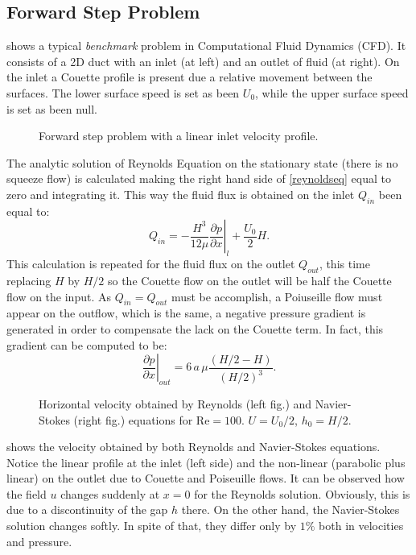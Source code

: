 \subsection{Forward Step Problem}

 shows a typical \emph{benchmark} problem in Computational Fluid Dynamics (CFD). It consists of a 2D duct with an inlet (at left) and an outlet of fluid (at right). On the inlet a Couette profile is present due a relative movement between the surfaces. The lower surface speed is set as been $U_0$, while the upper surface speed is set as been null.

 \begin{figure}[h]
 \centering 
 \def\svgwidth{\textwidth}	
\caption{Forward step problem with a linear inlet velocity profile.}\label{fig:forward_step}
\end{figure}

The analytic solution of Reynolds Equation on the stationary state (there is no squeeze flow) is calculated making the right hand side of \eqref{reynoldseq} equal to zero and integrating it. This way the fluid flux is obtained on the inlet $Q_{in}$ been equal to:
\begin{equation*}
Q_{in}=-\left.\frac{H^3}{12\mu}\frac{\partial p}{\partial x}\right|_l+\frac{U_0}{2}H
.
\end{equation*}
This calculation is repeated for the fluid flux on the outlet $Q_{out}$, this time replacing $H$ by $H/2$ so the Couette flow on the outlet will be half the Couette flow on the input. As $Q_{in}=Q_{out}$ must be accomplish, a Poiuseille flow must appear on the outflow, which is the same, a negative pressure gradient is generated in order to compensate the lack on the Couette term. In fact, this gradient can be computed to be:
\begin{equation*}
\left.\frac{\partial p}{\partial x}\right|_{out} = 6\,a\,\mu\frac{(H/2-H)}{(H/2)^3}.\label{eq:pressure_gap}
\end{equation*}

\begin{figure}[h!]\hspace*{-1cm}
\caption{Horizontal velocity obtained by Reynolds (left fig.) and Navier-Stokes (right fig.) equations for $\text{Re}=100$. $U=U_0/2$, $h_0=H/2$.}\label{fig:u_prof_RE_NS}
\end{figure}

 shows the velocity obtained by both Reynolds and Navier-Stokes equations. Notice the linear profile at the inlet (left side) and the non-linear (parabolic plus linear) on the outlet due to Couette and Poiseuille flows. It can be observed how the field $u$ changes suddenly at $x=0$ for the Reynolds solution. Obviously, this is due to a discontinuity of the gap $h$ there. On the other hand, the Navier-Stokes solution changes softly. In spite of that, they differ only by $1\%$ both in velocities and pressure.